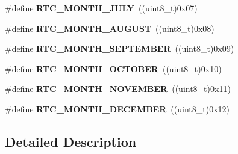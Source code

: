 \begin{DoxyCompactItemize}
\item 
\#define {\bfseries R\+T\+C\+\_\+\+M\+O\+N\+T\+H\+\_\+\+J\+U\+LY}~((uint8\+\_\+t)0x07)\hypertarget{group___r_t_c___month___date___definitions_gae710e500c34c042a263fcb47edeec29f}{}\label{group___r_t_c___month___date___definitions_gae710e500c34c042a263fcb47edeec29f}

\item 
\#define {\bfseries R\+T\+C\+\_\+\+M\+O\+N\+T\+H\+\_\+\+A\+U\+G\+U\+ST}~((uint8\+\_\+t)0x08)\hypertarget{group___r_t_c___month___date___definitions_ga4118ea385d30d3f75c2f879faf019f37}{}\label{group___r_t_c___month___date___definitions_ga4118ea385d30d3f75c2f879faf019f37}

\item 
\#define {\bfseries R\+T\+C\+\_\+\+M\+O\+N\+T\+H\+\_\+\+S\+E\+P\+T\+E\+M\+B\+ER}~((uint8\+\_\+t)0x09)\hypertarget{group___r_t_c___month___date___definitions_ga2a4d94eeb920cb994cd11e169d086d28}{}\label{group___r_t_c___month___date___definitions_ga2a4d94eeb920cb994cd11e169d086d28}

\item 
\#define {\bfseries R\+T\+C\+\_\+\+M\+O\+N\+T\+H\+\_\+\+O\+C\+T\+O\+B\+ER}~((uint8\+\_\+t)0x10)\hypertarget{group___r_t_c___month___date___definitions_gab4e8870c5a2fe6fc632d2050d490ef9f}{}\label{group___r_t_c___month___date___definitions_gab4e8870c5a2fe6fc632d2050d490ef9f}

\item 
\#define {\bfseries R\+T\+C\+\_\+\+M\+O\+N\+T\+H\+\_\+\+N\+O\+V\+E\+M\+B\+ER}~((uint8\+\_\+t)0x11)\hypertarget{group___r_t_c___month___date___definitions_ga2f04d521214ea447155faff077725212}{}\label{group___r_t_c___month___date___definitions_ga2f04d521214ea447155faff077725212}

\item 
\#define {\bfseries R\+T\+C\+\_\+\+M\+O\+N\+T\+H\+\_\+\+D\+E\+C\+E\+M\+B\+ER}~((uint8\+\_\+t)0x12)\hypertarget{group___r_t_c___month___date___definitions_gaa2d8ee14bdc0c6b01be7c72b82ae64e5}{}\label{group___r_t_c___month___date___definitions_gaa2d8ee14bdc0c6b01be7c72b82ae64e5}

\end{DoxyCompactItemize}


\subsection{Detailed Description}

